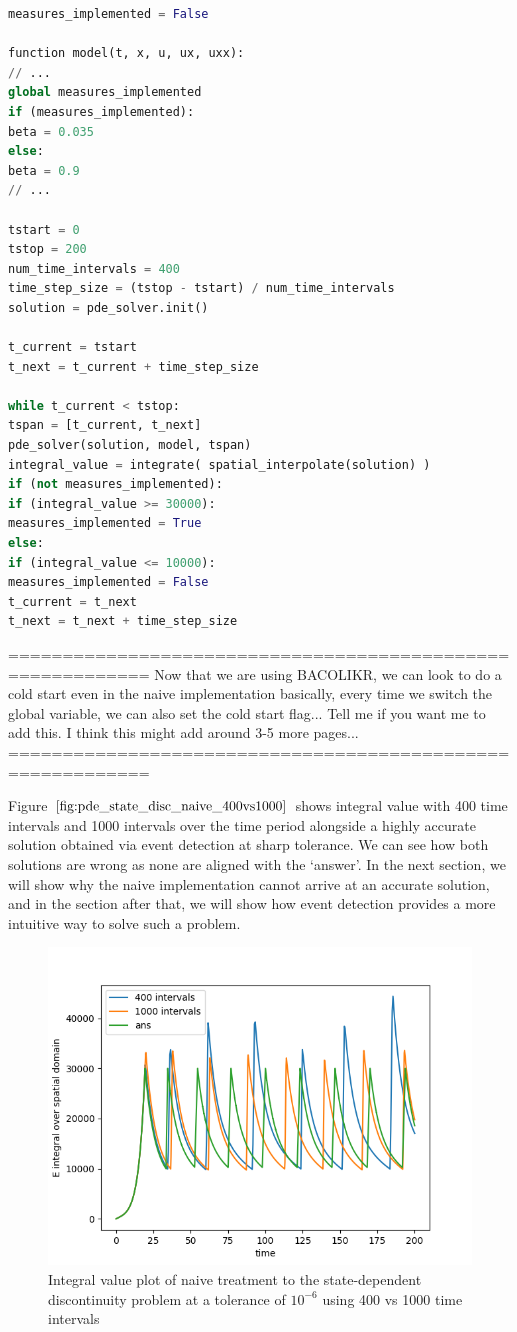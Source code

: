 \documentclass{article}
\begin{document}
\begin{minipage}{\linewidth}
\begin{lstlisting}[language=Python]
measures_implemented = False

function model(t, x, u, ux, uxx):
// ...
global measures_implemented
if (measures_implemented):
beta = 0.035
else:
beta = 0.9
// ...

tstart = 0
tstop = 200
num_time_intervals = 400
time_step_size = (tstop - tstart) / num_time_intervals
solution = pde_solver.init()

t_current = tstart
t_next = t_current + time_step_size

while t_current < tstop:
tspan = [t_current, t_next]
pde_solver(solution, model, tspan)
integral_value = integrate( spatial_interpolate(solution) )
if (not measures_implemented):
if (integral_value >= 30000):
measures_implemented = True
else:
if (integral_value <= 10000):
measures_implemented = False
t_current = t_next
t_next = t_next + time_step_size
\end{lstlisting}
\end{minipage} 

===========================================================
Now that we are using BACOLIKR, we can look to do a cold start even in the naive implementation
basically, every time we switch the global variable, we can also set the cold start flag...
Tell me if you want me to add this. I think this might add around 3-5 more pages... 
===========================================================

Figure $\ref{fig:pde_state_disc_naive_400vs1000}$ shows integral value with 400 time intervals and 1000 intervals over the time period alongside a highly accurate solution obtained via event detection at sharp tolerance. We can see how both solutions are wrong as none are aligned with the `answer'. In the next section, we will show why the naive implementation cannot arrive at an accurate solution, and in the section after that, we will show how event detection provides a more intuitive way to solve such a problem.

\begin{figure}[H]
\centering
\includegraphics[width=0.7\linewidth]{./figures/pde_state_disc_naive_400vs1000}
\caption{Integral value plot of naive treatment to the state-dependent discontinuity problem at a tolerance of $10^{-6}$ using 400 vs 1000 time intervals}
\label{fig:pde_state_disc_naive_400vs1000}
\end{figure}
\end{document}
